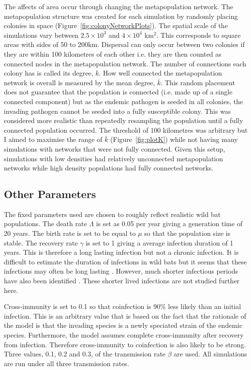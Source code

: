 The affects of area occur through changing the metapopulation network.
The metapopulation structure was created for each simulation by randomly placing colonies in space (Figure~\ref{fig:colonyNetworkPlots}).
The spatial scale of the simulations vary between \ensuremath{2.5\times 10^{3}} and \ensuremath{4\times 10^{4}} km$^2$.
This corresponds to square areas with sides of 50 to 200km.
Dispersal can only occur between two colonies if they are within 100 kilometres of each other i.e. they are then counted as connected nodes in the metapopulation network.
The number of connections each colony has is called its degree, $k$.
How well connected the metapopulation network is overall is measured by the mean degree, $\bar{k}$.
This random placement does not guarantee that the population is connected (i.e. made up of a single connected component) but as the endemic pathogen is seeded in all colonies, the invading pathogen cannot be seeded into a fully susceptible colony.
This was considered more realistic than repeatedly resampling the population until a fully connected population occurred.
The threshold of 100 kilometres was arbitrary but I aimed to maximise the range  of $\bar{k}$ (Figure~\ref{fig:plotK}) while not having many simulations with networks that were not fully connected.
Given this setup, simulations with low densities had relatively unconnected metapopulation networks while high density populations had fully connected networks.



\subsection{Other Parameters}


The fixed parameters used are chosen to roughly reflect realistic wild bat populations. 
The death rate $\Lambda$ is set as 0.05 per year giving a generation time of 20 years.
The birth rate is set to be equal to $\mu$ so that the population size is stable.
The recovery rate $\gamma$ is set to 1 giving a average infection duration of 1 years. 
This is therefore a long lasting infection but not a chronic infection. 
It is difficult to estimate the duration of infections in wild bats but it seems that these infections may often be long lasting \cite{peel2012henipavirus, plowright2015ecological}.
However, much shorter infectious periods have also been identified \cite{amengual2007temporal}.
These shorter lived infections are not studied further here.

Cross-immunity is set to 0.1 so that coinfection is 90\% less likely than an initial infection.
This is an arbitrary value that is based on the fact that the rationale of the model is that the invading species is a newly speciated strain of the endemic species.
Furthermore, the model assumes complete cross-immunity after recovery from infection.
Therefore cross-immunity to coinfection is also likely to be strong.
Three values, 0.1, 0.2 and 0.3, of the transmission rate $\beta$ are used.
All simulations are run under all three transmission rates.



